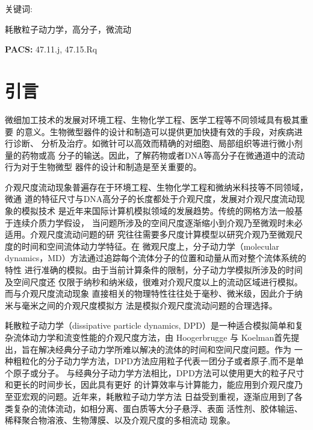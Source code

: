 \documentclass[twoside,12pt]{article}
\begin{document}
\begin{center}
\begin{minipage}{15.5cm}
\begin{minipage}[t]{2.3cm}{ 关键词: }\end{minipage}
\begin{minipage}[t]{13.1cm}
耗散粒子动力学，高分子，微流动
\end{minipage}\par{}
{\bf PACS: }
47.11.j, 47.15.Rq
\end{minipage}
\end{center}

\section{ 引言}

微细加工技术的发展对环境工程、生物化学工程、医学工程等不同领域具有极其重要
的意义。生物微型器件的设计和制造可以提供更加快捷有效的手段，对疾病进行诊断、
分析及治疗。如微针可以高效而精确的对细胞、局部组织等进行微小剂量的药物或高
分子的输送。因此，了解药物或者DNA等高分子在微通道中的流动行为对于生物微型
器件的设计和制造是至关重要的。

介观尺度流动现象普遍存在于环境工程、生物化学工程和微纳米科技等不同领域，微通
道的特征尺寸与DNA高分子的长度都处于介观尺度，发展对介观尺度流动现象的模拟技术
是近年来国际计算机模拟领域的发展趋势。传统的网格方法一般基于连续介质力学假设，
当问题所涉及的空间尺度逐渐缩小到介观乃至微观时未必适用。介观尺度流动问题的研
究往往需要多尺度计算模型以研究介观乃至微观尺度的时间和空间流体动力学特征。在
微观尺度上，分子动力学（molecular dynamics，MD）方法\cite{Rapaport}通过追踪每个流体分子的位置和动量从而对整个流体系统的特性
进行准确的模拟。由于当前计算条件的限制，分子动力学模拟所涉及的时间及空间尺度还
仅限于纳秒和纳米级，很难对介观尺度以上的流动区域进行模拟。而与介观尺度流动现象
直接相关的物理特性往往处于毫秒、微米级，因此介于纳米与毫米之间的介观尺度模拟方
法是模拟介观尺度流动问题的合理选择。


耗散粒子动力学（dissipative particle dynamics, DPD）\cite{Hoogerbrugge,Groot1997}是一种适合模拟简单和复杂流体动力学和流变性能的介观尺度方法，由 Hoogerbrugge 与 Koelman首先提出，旨在解决经典分子动力学所难以解决的流体的时间和空间尺度问题。作为
一种粗粒化的分子动力学方法，DPD方法应用粒子代表一团分子或者原子,而不是单个原子或分子。
与经典分子动力学方法相比，DPD方法可以使用更大的粒子尺寸和更长的时间步长，因此具有更好
的计算效率与计算能力，能应用到介观尺度乃至亚宏观的问题\cite{Chen_S}。近年来，耗散粒子动力学方法
日益受到重视，逐渐应用到了各类复杂的流体流动，如相分离\cite{Groot1997}、蛋白质等大分子悬浮\cite{Fan_X}、表面
活性剂\cite{Groot2003, Groot2000}、胶体输运\cite{Dzwinel_W, Tanaka_H}、稀释聚合物溶液\cite{Schlijper}、生物薄膜\cite{Venturoli}、以及介观尺度的多相流动
现象\cite{MBLiu2006, MBLiu2007wrr, MBLiu2007jcp, MBLiu2008}。
\end{document}
